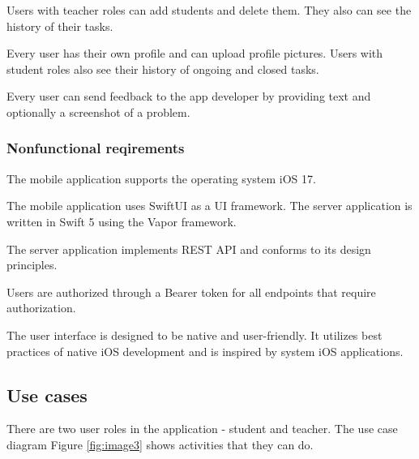 \documentclass[
  biblatex,
  language=english,
  figures=false,
  sourcecodes,
  glossaries,
  index
]{kidiplom}
\begin{document}
Users with teacher roles can add students and delete them. They also can see the history of their tasks.

Every user has their own profile and can upload profile pictures. Users with student roles also see their history of ongoing and closed tasks.

Every user can send feedback to the app developer by providing text and optionally a screenshot of a problem.

\subsubsection{Nonfunctional reqirements}
The mobile application supports the operating system iOS 17.

The mobile application uses SwiftUI as a UI framework. The server application is written in Swift 5 using the Vapor framework.

The server application implements REST API and conforms to its design principles.

Users are authorized through a Bearer token for all endpoints that require authorization.

The user interface is designed to be native and user-friendly. It utilizes best practices of native iOS development and is inspired by system iOS applications.

\subsection{Use cases}

There are two user roles in the application - student and teacher. The use case diagram Figure \ref{fig:image3} shows activities that they can do.
\end{document}

